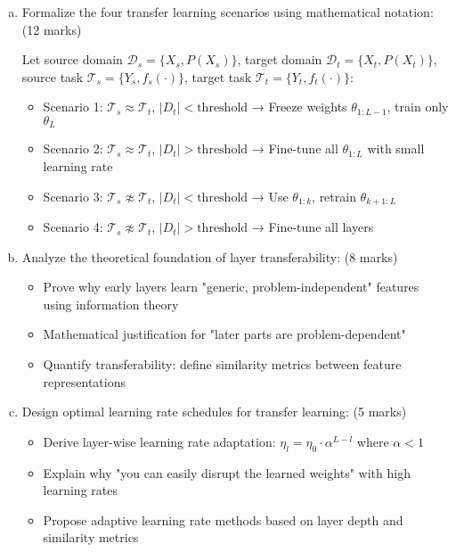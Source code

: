 \documentclass[12pt]{article}
\newcommand{\shortanswer}{\vspace{2cm}}
\newcommand{\mediumanswer}{\vspace{3cm}}
\newcommand{\journalspace}{\vspace{4.5cm}}
\begin{document}
\begin{enumerate}[(a)]
    \item Formalize the four transfer learning scenarios using mathematical notation: \hfill (12 marks)
    
    Let source domain $\mathcal{D}_s = \{X_s, P(X_s)\}$, target domain $\mathcal{D}_t = \{X_t, P(X_t)\}$, source task $\mathcal{T}_s = \{Y_s, f_s(\cdot)\}$, target task $\mathcal{T}_t = \{Y_t, f_t(\cdot)\}$:
    
    \begin{itemize}
        \item Scenario 1: $\mathcal{T}_s \approx \mathcal{T}_t$, $|D_t| < \text{threshold}$ → Freeze weights $\theta_{1:L-1}$, train only $\theta_L$
        \item Scenario 2: $\mathcal{T}_s \approx \mathcal{T}_t$, $|D_t| > \text{threshold}$ → Fine-tune all $\theta_{1:L}$ with small learning rate
        \item Scenario 3: $\mathcal{T}_s \not\approx \mathcal{T}_t$, $|D_t| < \text{threshold}$ → Use $\theta_{1:k}$, retrain $\theta_{k+1:L}$
        \item Scenario 4: $\mathcal{T}_s \not\approx \mathcal{T}_t$, $|D_t| > \text{threshold}$ → Fine-tune all layers
    \end{itemize}
    
    \journalspace
    
    \item Analyze the theoretical foundation of layer transferability: \hfill (8 marks)
    \begin{itemize}
        \item Prove why early layers learn "generic, problem-independent" features using information theory
        \item Mathematical justification for "later parts are problem-dependent"
        \item Quantify transferability: define similarity metrics between feature representations
    \end{itemize}
    
    \mediumanswer
    
    \item Design optimal learning rate schedules for transfer learning: \hfill (5 marks)
    \begin{itemize}
        \item Derive layer-wise learning rate adaptation: $\eta_l = \eta_0 \cdot \alpha^{L-l}$ where $\alpha < 1$
        \item Explain why "you can easily disrupt the learned weights" with high learning rates
        \item Propose adaptive learning rate methods based on layer depth and similarity metrics
    \end{itemize}
    
    \shortanswer
\end{enumerate}
\end{document}
